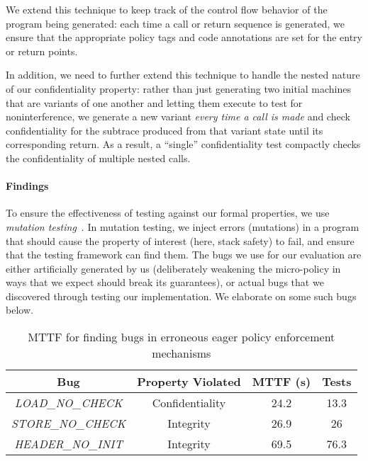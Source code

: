 \documentclass[acmsmall,review,anonymous]{acmart}\settopmatter{printfolios=true,printccs=false,printacmref=false}
\begin{document}
{{We extend this technique to keep track of the control flow behavior of
the program being generated: each time a call or return sequence is
generated, we ensure that the appropriate policy tags and code
annotations are set for the entry or return points.%

In addition, we need to further extend this technique to handle the nested
nature of our confidentiality property: rather than just generating two
initial machines that are variants of one another and letting them
execute to test for noninterference, we generate a new variant
{\em every time a call is made} and check confidentiality for the
subtrace produced from that variant state until its corresponding
return. As a result, a ``single'' confidentiality test compactly
checks the confidentiality of multiple nested calls.

\paragraph*{Findings}

To ensure the effectiveness of testing against our formal properties, we
use {\em mutation testing}~\citep{JiaH11}. In mutation testing, we inject errors
(mutations) in a program that should cause the property of interest (here,
stack safety) to fail, and ensure that the testing framework can find
them. The bugs we use for our evaluation are either artificially generated
by us (deliberately weakening the micro-policy in ways that we expect
should break its guarantees), or actual bugs that we discovered through
testing our implementation. We elaborate on some such bugs below.

\begin{table}[]
\centering
\begin{tabular}{c|c|c|c}
  Bug & Property Violated & MTTF (s) & Tests \\
  \hline
      {\em LOAD\_NO\_CHECK}  & Confidentiality & 24.2 & 13.3 \\
      {\em STORE\_NO\_CHECK} & Integrity & 26.9 & 26 \\
      {\em HEADER\_NO\_INIT} & Integrity & 69.5 & 76.3 \\
\end{tabular}
\vspace*{1em}
\caption{MTTF for finding bugs in erroneous eager policy enforcement mechanisms}
\vspace*{-2em}
\label{tab:bug-table}
\end{table}

}}
\end{document}

